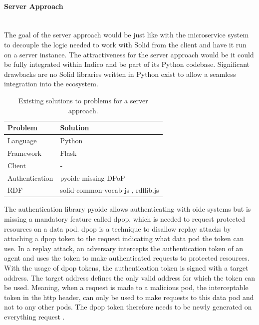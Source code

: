 \paragraph{Server Approach}\mbox{}\\

The goal of the server approach would be just like with the microservice system to decouple the logic needed to work with Solid from the client and have it run on a server instance. The attractiveness for the server approach would be it could be fully integrated within Indico and be part of its Python codebase. Significant drawbacks are no Solid libraries written in Python exist to allow a seamless integration into the ecosystem.

\begin{table}[!ht]
    \centering
    \begin{tabular}{| l | l |} 
    \hline
     Problem & Solution \\
     \hline
      Language & Python  \\
      Framework & Flask  \\
      Client & -  \\
      Authentication & pyoidc \cite{pyoidc} missing DPoP\\
      RDF & solid-common-vocab-js \cite{solid-common-vocab-js}, rdflib.js \cite{rdflib.js}  \\
    \hline
    \end{tabular}
    \vspace{0.75cm}
    \caption{Existing solutions to problems for a server approach.}
    \label{table:3}
\end{table}

The authentication library pyoidc allows authenticating with \gls{oidc} systems but is missing a mandatory feature called \gls{dpop}, which is needed to request protected resources on a data pod. \gls{dpop} is a technique to disallow replay attacks by attaching a \gls{dpop} token to the request indicating what data pod the token can use. In a replay attack, an adversary intercepts the authentication token of an agent and uses the token to make authenticated requests to protected resources. With the usage of \gls{dpop} tokens, the authentication token is signed with a target address. The target address defines the only valid address for which the token can be used. Meaning, when a request is made to a malicious pod, the interceptable token in the \gls{http} header, can only be used to make requests to this data pod and not to any other pods. The \gls{dpop} token therefore needs to be newly generated on everything request \cite{dpop-spec}.

